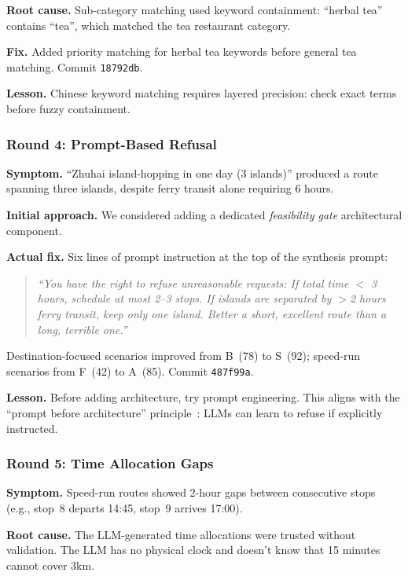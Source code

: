\textbf{Root cause.} Sub-category matching used keyword containment: ``herbal tea'' contains ``tea'', which matched the tea restaurant category.

\textbf{Fix.} Added priority matching for herbal tea keywords before general tea matching. Commit \texttt{18792db}.

\textbf{Lesson.} Chinese keyword matching requires layered precision: check exact terms before fuzzy containment.

\subsubsection{Round 4: Prompt-Based Refusal}

\textbf{Symptom.} ``Zhuhai island-hopping in one day (3 islands)'' produced a route spanning three islands, despite ferry transit alone requiring 6 hours.

\textbf{Initial approach.} We considered adding a dedicated \textit{feasibility gate} architectural component.

\textbf{Actual fix.} Six lines of prompt instruction at the top of the synthesis prompt:

\begin{quote}
\textit{``You have the right to refuse unreasonable requests: If total time $<$ 3 hours, schedule at most 2--3 stops. If islands are separated by $>$2 hours ferry transit, keep only one island. Better a short, excellent route than a long, terrible one.''}
\end{quote}

Destination-focused scenarios improved from B~(78) to S~(92); speed-run scenarios from F~(42) to A~(85). Commit \texttt{487f99a}.

\textbf{Lesson.} Before adding architecture, try prompt engineering. This aligns with the ``prompt before architecture'' principle~\cite{white2023prompt}: LLMs can learn to refuse if explicitly instructed.

\subsubsection{Round 5: Time Allocation Gaps}

\textbf{Symptom.} Speed-run routes showed 2-hour gaps between consecutive stops (e.g., stop~8 departs 14:45, stop~9 arrives 17:00).

\textbf{Root cause.} The LLM-generated time allocations were trusted without validation. The LLM has no physical clock and doesn't know that 15 minutes cannot cover 3km.

